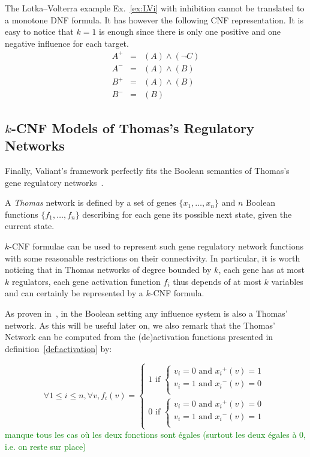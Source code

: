 \documentclass{llncs}
\newcommand{\sylvain}[1]{\textcolor{green}{#1}}
\begin{document}
\begin{example}
   The Lotka--Volterra example Ex.~\ref{ex:LVi} with inhibition cannot be
   translated to a monotone DNF formula. It has however the following CNF
   representation. It is easy to
   notice that $k=1$ is enough since there is only one positive and one
   negative influence for each target.
\begin{eqnarray*}
   A^+&=&(A)\wedge(\neg C)\\
A^-&=&(A) \wedge (B)\\
B^+&=&(A)\wedge (B)\\
   B^-&=&(B)
\end{eqnarray*}

\end{example}


\subsection{$k$-CNF Models of Thomas's Regulatory Networks}

Finally, Valiant's framework perfectly fits the Boolean semantics of Thomas's gene
regulatory networks~\cite{Thomas73jtb}.

\begin{definition}
   A \emph{Thomas} network is defined by a set of genes $\{x_1,\dots,x_n\}$
   and $n$ Boolean functions $\{f_1,\dots,f_n\}$ describing for each gene its
   possible next state, given the current state.
\end{definition}

$k$-CNF formulae can be used to represent such gene regulatory network functions with some reasonable restrictions on their connectivity.
In particular, it is worth noticing that in Thomas networks of degree bounded by $k$,
each gene has at most $k$ regulators, each gene activation function $f_i$ thus depends of at most $k$ variables
and can certainly be represented by a $k$-CNF formula.

As proven in~\cite{FMRS16cmsb}, in the Boolean setting any influence system is
also a Thomas' network.
As this will be useful later on, we also remark that the Thomas' Network can be computed from the (de)activation functions presented in definition~\ref{def:activation} by:

\[
\forall 1 \leq i \leq n, \forall v, f_i(v) = \left\{\begin{array}{l}
1 \text{ if } \left\{\begin{array}{l}
v_i = 0 \text{ and } {x_i}^+(v) = 1\\
v_i = 1 \text{ and } {x_i}^-(v) = 0 \\
\end{array}\right.\\[1em]
0 \text{ if } \left\{\begin{array}{l}
v_i = 0 \text{ and } {x_i}^+(v) = 0\\
v_i = 1 \text{ and } {x_i}^-(v) = 1\\
\end{array}\right.
\end{array}\right.
\]
\sylvain{manque tous les cas où les deux fonctions sont égales (surtout les
deux égales à 0, i.e. on reste sur place)}
\end{document}
